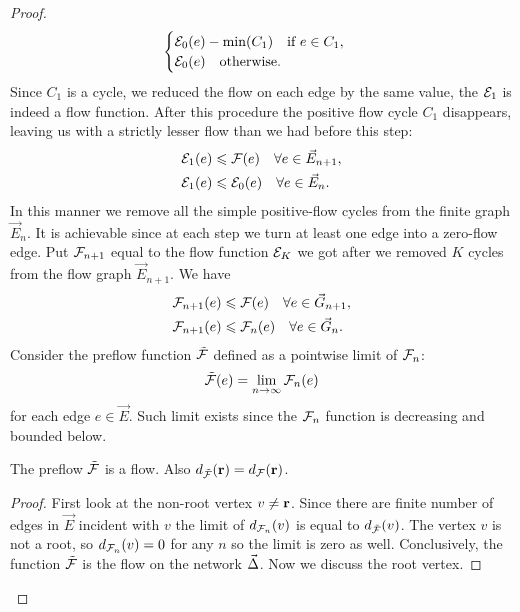 \documentclass[12pt]{article}
\begin{document}
\begin{proof}
\begin{equation*}
        \begin{cases}
          \cal{E}_0(e) - \min(C_1) \quad \text{if } e \in C_1,\\
          \cal{E}_0(e) \quad \text{otherwise}.
        \end{cases}
      \end{equation*}
      Since $C_1$ is a cycle, we reduced the flow on each edge by the same value,
        the $\cal{E}_1$ is indeed a flow function.
      After this procedure the positive flow cycle $C_1$ disappears,
        leaving us with a strictly lesser flow than we had before this step:
      \begin{align*}
        &\cal{E}_1(e) \leq \flowpos(e) \quad \forall e \in \vec{E}_{n+1},\\
        &\cal{E}_1(e) \leq \cal{E}_0(e) \quad \forall e \in \vec{E}_n.
      \end{align*}
      In this manner we remove all the simple positive-flow cycles from the finite graph $\vec{E}_n$.
      It is achievable since at each step we turn at least one edge into a zero-flow edge.
      Put $\flowposn{n+1}$ equal to the flow function $\cal{E}_K$ we got after we removed $K$ cycles from the flow graph $\vec{E}_{n+1}$.
      We have
      \begin{align*}
        &\flowposn{n+1}(e) \leq \flowpos(e) \quad \forall e \in \vec{G}_{n+1},\\
        &\flowposn{n+1}(e) \leq \flowposn{n}(e) \quad \forall e \in \vec{G}_n.
      \end{align*}
      Consider the preflow function $\preflow$ defined as a pointwise limit of $\flowposn{n}$:
      \[
        \preflow(e) = \lim_{n\to \infty}\flowposn{n}(e)
      \]
        for each edge $e \in \vec{E}$.
      Such limit exists since the $\flowposn{n}$ function is decreasing and bounded below.
      \begin{prop}
        The preflow $\preflow$ is a flow.
        Also $d_{\preflow}(\root) = d_{\flowpos}(\root)$.
      \end{prop}
      \begin{proof}
        First look at the non-root vertex $v \neq \root$.
        Since there are finite number of edges in $\vec{E}$ incident with $v$ the limit of
        $d_{\flowposn{n}}(v)$ is equal to $d_{\preflow}(v)$.
        The vertex $v$ is not a root, so $d_{\flowposn{n}}(v) = 0$ for any $n$ so the limit is zero as well.
        Conclusively, the function $\preflow$ is the flow on the network $\onet$.
        Now we discuss the root vertex.

\end{proof}
\end{proof}
\end{document}

